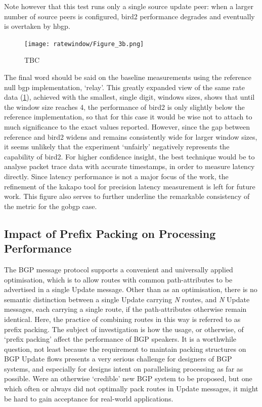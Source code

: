 Note however that this test runs only a single source update peer: when a larger number of source peers is configured, bird2 performance degrades and eventually is overtaken by hbgp.

\begin{figure}[H]
    \centering
    \texttt{[image: ratewindow/Figure\_3b.png]}
    \caption{TBC }
    \label{fig:rw_fig3b}
\end{figure}

The final word should be said on the baseline measurements using the reference null bgp implementation, ‘relay’.
This greatly expanded view of the same rate data (\ref{fig:rw_fig3b}), achieved with the smallest, single digit, windows sizes, shows that until the window size reaches 4, the performance of bird2 is only slightly below the reference implementation, so that for this case it would be wise not to attach to much significance to the exact values reported.
However, since the gap between reference and bird2 widens and remains consistently wide for larger window sizes, it seems unlikely that the experiment ‘unfairly’ negatively represents the capability of bird2.
For higher confidence  insight,  the best technique would be to analyse packet trace data with accurate timestamps, in order to measure latency directly.
Since latency performance is not a major focus of the work, the refinement of the kakapo tool for precision latency measurement is left for future work.
This figure also serves to further underline the remarkable consistency of the metric for the gobgp case.

\subsection{Impact of Prefix Packing on Processing Performance}
The BGP message protocol supports a convenient and universally applied optimisation, which is to allow routes with common path-attributes to be advertised in a single Update message.
Other than as an optimisation, there is no semantic distinction between a single Update carrying \textit{N} routes, and \textit{N} Update messages, each carrying a single route, if the path-attributes otherwise remain identical.
Here, the practice of combining routes in this way is referred to as prefix packing.
The subject of investigation is how the usage, or otherwise, of `prefix packing' affect the performance of BGP speakers.
It is a worthwhile question, not least because the requirement to maintain packing structures on BGP Update flows presents a very serious challenge for designers of BGP systems, and especially for designs intent on parallelising processing as far as possible.
Were an otherwise `credible' new BGP system to be proposed, but one which often or always did not optimally pack routes in Update messages, it might be hard to gain acceptance for real-world applications.

